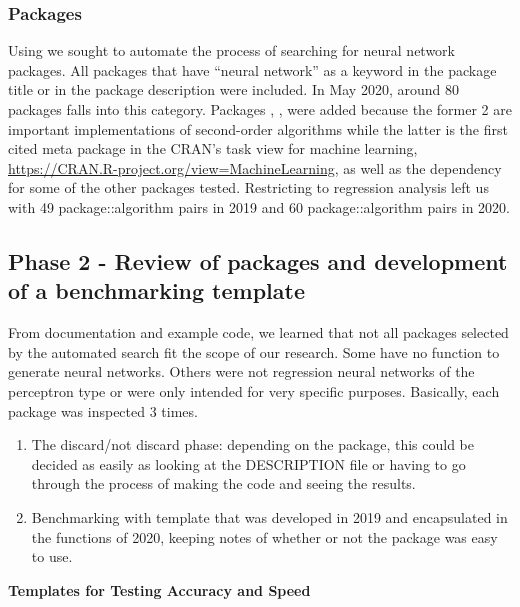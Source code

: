 \hypertarget{packages}{%
\subsubsection{Packages}\label{packages}}

Using  \citep{R-RWsearch} we sought to automate the
process of searching for neural network packages. All packages that have
``neural network'' as a keyword in the package title or in the package
description were included. In May 2020, around 80 packages falls into
this category. Packages , ,  were
added because the former 2 are important implementations of second-order
algorithms while the latter is the first cited meta package in the
CRAN's task view for machine learning,
\url{https://CRAN.R-project.org/view=MachineLearning}, as well as the
dependency for some of the other packages tested. Restricting to
regression analysis left us with 49 package::algorithm pairs in 2019 and
60 package::algorithm pairs in 2020.

\hypertarget{phase-2---review-of-packages-and-development-of-a-benchmarking-template}{%
\subsection{Phase 2 - Review of packages and development of a
benchmarking
template}\label{phase-2---review-of-packages-and-development-of-a-benchmarking-template}}

From documentation and example code, we learned that not all packages
selected by the automated search fit the scope of our research. Some
have no function to generate neural networks. Others were not regression
neural networks of the perceptron type or were only intended for very
specific purposes. Basically, each package was inspected 3 times.

\begin{enumerate}
\def\labelenumi{\arabic{enumi}.}
\item
  The discard/not discard phase: depending on the package, this could be
  decided as easily as looking at the DESCRIPTION file or having to go
  through the process of making the code and seeing the results.
\item
  Benchmarking with template that was developed in 2019 and encapsulated
  in the functions of 2020, keeping notes of whether or not the package
  was easy to use.
\end{enumerate}

\textbf{Templates for Testing Accuracy and Speed}

